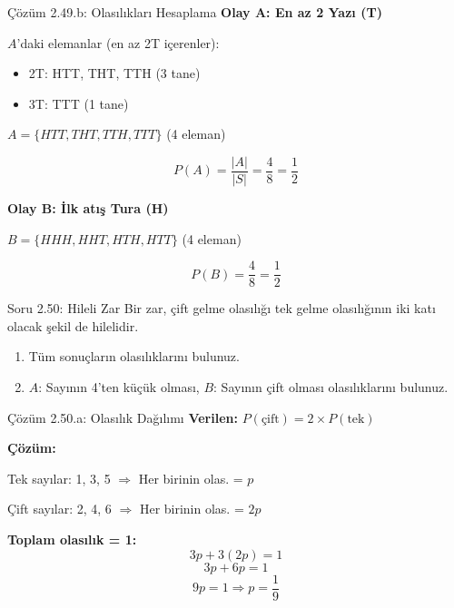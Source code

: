 \documentclass[light]{lutbeamer}
\begin{document}
\begin{frame}{Çözüm 2.49.b: Olasılıkları Hesaplama}
    \color{blue}
    \textbf{Olay A: En az 2 Yazı (T)}
    
    $A$'daki elemanlar (en az 2T içerenler):
    \begin{itemize}
        \item 2T: HTT, THT, TTH (3 tane)
        \item 3T: TTT (1 tane)
    \end{itemize}
    
    $A = \{HTT, THT, TTH, TTT\}$ (4 eleman)
    
    \[ P(A) = \frac{|A|}{|S|} = \frac{4}{8} = \frac{1}{2} \]
    
    \vspace{0.5cm}
    \textbf{Olay B: İlk atış Tura (H)}
    
    $B = \{HHH, HHT, HTH, HTT\}$ (4 eleman)
    
    \[ P(B) = \frac{4}{8} = \frac{1}{2} \]
    
    \begin{center}
    \end{center}
\end{frame}

\begin{frame}{Soru 2.50: Hileli Zar}
    Bir zar, çift gelme olasılığı tek gelme olasılığının iki katı olacak şekil de hilelidir.
    \begin{enumerate}
        \item Tüm sonuçların olasılıklarını bulunuz.
        \item $A$: Sayının 4'ten küçük olması, $B$: Sayının çift olması olasılıklarını bulunuz.
    \end{enumerate}
\end{frame}

\begin{frame}{Çözüm 2.50.a: Olasılık Dağılımı}
    \color{blue}
    \textbf{Verilen:} $P(\text{çift}) = 2 \times P(\text{tek})$
    
    \vspace{0.3cm}
    \textbf{Çözüm:}
    
    Tek sayılar: 1, 3, 5 $\Rightarrow$ Her birinin olas. = $p$
    
    Çift sayılar: 2, 4, 6 $\Rightarrow$ Her birinin olas. = $2p$
    
    \vspace{0.3cm}
    \textbf{Toplam olasılık = 1:}
    \[ 3p + 3(2p) = 1 \]
    \[ 3p + 6p = 1 \]
    \[ 9p = 1 \Rightarrow p = \frac{1}{9} \]
    
    \vspace{0.3cm}
    \begin{center}
    \end{center}
\end{frame}
\end{document}
